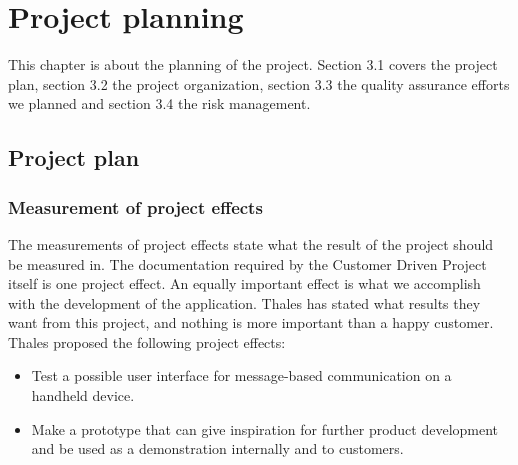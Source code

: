 \chapter{Project planning}

This chapter is about the planning of the project. Section 3.1 covers the project plan, section 3.2 the project organization, section 3.3 the quality assurance efforts we planned and section 3.4 the risk management. 

\section{Project plan}

\subsection{Measurement of project effects}
The measurements of project effects state what the result of the project should be measured in. The documentation required by the Customer Driven Project itself is one project effect. An equally important effect is what we accomplish with the development of the application. Thales has stated what results they want from this project, and nothing is more important than a happy customer.
\newline
\newline
Thales proposed the following project effects:
\begin{itemize}
\item{}Test a possible user interface for message-based communication on a handheld device.
\item{}Make a prototype that can give inspiration for further product development and be used as a demonstration internally and to customers.
\end{itemize}